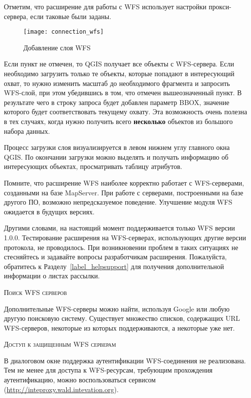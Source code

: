 Отметим, что расширение для работы с WFS использует настройки
прокси-сервера, если таковые были заданы.

\begin{figure}[ht]
  \centering
  	\texttt{[image: connection\_wfs]}
  	\caption{Добавление слоя WFS \nixcaption}\label{fig:wfs_dmsolutions}
\end{figure}

Если пункт 
не отмечен, то QGIS получает все объекты с WFS-сервера. Если необходимо
загрузить только те объекты, которые попадают в интересующий охват,
то нужно изменить масштаб до необходимого фрагмента и запросить WFS-слой, при
этом убедившись в том, что отмечен вышеозначенный пункт. В результате
чего в строку запроса будет добавлен параметр BBOX, значение которого будет
соответствовать текущему охвату. Эта возможность очень полезна в тех случаях,
когда нужно получить всего \textbf{несколько} объектов из большого набора
данных.

Процесс загрузки слоя визуализируется в левом нижнем углу главного окна
QGIS. По окончании загрузки можно выделять и получать информацию об
интересующих объектах, просматривать таблицу атрибутов.

Помните, что расширение WFS наиболее корректно работает с WFS-серверами,
созданными на базе MapServer. При работе с серверами, построенными на базе
другого ПО, возможно непредсказуемое поведение. Улучшение модуля WFS
ожидается в будущих версиях.

Другими словами, на настоящий момент поддерживается только WFS версии 1.0.0.
Тестирование расширения на WFS-серверах, использующих другие версии
протокола, не проводилось. При возникновении проблем в таких ситуациях
не стесняйтесь и задавайте вопросы разработчикам расширения.
Пожалуйста, обратитесь к Разделу~\ref{label_helpsupport} для получения
дополнительной информации о листах рассылки.

\begin{Tip}[htb]\caption{\textsc{Поиск WFS серверов}}
Дополнительные WFS-серверы можно найти, используя Google
или любую другую поисковую систему. Существует множество списков, содержащих
URL WFS-серверов, некоторые из которых поддерживаются, а некоторые уже нет.
\end{Tip}

\begin{Tip}[htb]\caption{\textsc{Доступ к защищенным WFS серверам}}
В диалоговом окне  поддержка
аутентификации WFS-соединения не реализована. Тем не менее для доступа к
WFS-ресурсам, требующим прохождения аутентификацию, можно воспользоваться
сервисом (\url{http://inteproxy.wald.intevation.org}).
\end{Tip}

\FloatBarrier
